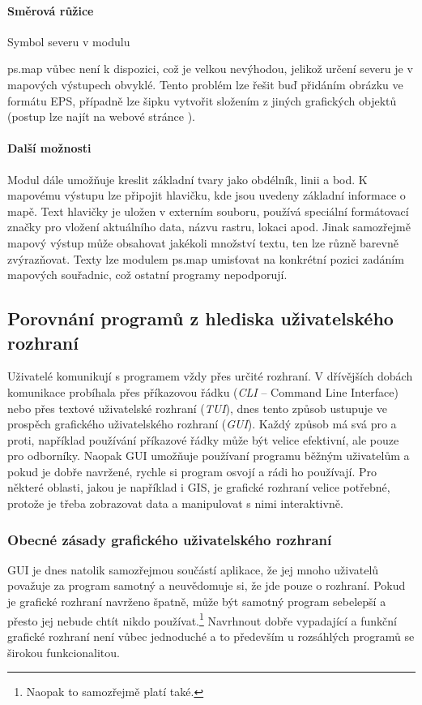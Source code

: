 \documentclass[a4paper,12pt,draft]{article}
\begin{document}
\paragraph*{Směrová růžice}
Symbol severu v modulu {ps.map vůbec není k dispozici, což je velkou
nevýhodou, jelikož určení severu je v mapových výstupech obvyklé. Tento
problém lze řešit buď přidáním obrázku ve formátu EPS, případně
lze šipku vytvořit složením z jiných grafických objektů (postup lze
najít na webové stránce \cite{wiki_psmap_north}).

\paragraph*{Další možnosti}
Modul dále umožňuje kreslit základní tvary jako obdélník, linii a
bod. K mapovému výstupu lze připojit hlavičku, kde jsou uvedeny základní
informace o mapě. Text hlavičky je uložen v externím souboru, používá
speciální formátovací značky pro vložení aktuálního data, názvu
rastru, lokaci apod. Jinak samozřejmě mapový výstup může obsahovat
jakékoli množství textu, ten lze různě barevně zvýrazňovat. Texty lze
modulem ps.map umisťovat na konkrétní pozici zadáním mapových
souřadnic, což ostatní programy nepodporují.




\subsection{Porovnání programů  z hlediska
uživatelského rozhraní}
Uživatelé komunikují s programem vždy přes určité rozhraní. V
dřívějších dobách komunikace probíhala přes příkazovou
řádku (\emph{CLI} -- Command Line Interface) nebo přes textové uživatelské
rozhraní (\emph{TUI}), dnes tento způsob ustupuje ve prospěch grafického
uživatelského
rozhraní (\emph{GUI}). Každý způsob má svá pro a proti, například
používání příkazové řádky může být velice efektivní, ale pouze
pro odborníky. Naopak GUI umožňuje používaní programu běžným
uživatelům a pokud je dobře navržené, rychle si program osvojí a
rádi ho používají. Pro některé oblasti, jakou je například i GIS,
je grafické rozhraní velice potřebné, protože je třeba zobrazovat data
a manipulovat s nimi interaktivně.

\subsubsection{Obecné zásady grafického uživatelského rozhraní}
GUI je dnes natolik samozřejmou součástí aplikace, že jej mnoho
uživatelů považuje za program samotný a neuvědomuje si, že jde
pouze o rozhraní. Pokud je grafické rozhraní navrženo špatně,
může být samotný program sebelepší a přesto jej nebude chtít nikdo
používat.\footnote{Naopak to samozřejmě platí také.} Navrhnout dobře
vypadající a funkční grafické rozhraní není vůbec jednoduché a to
především u rozsáhlých programů se širokou funkcionalitou.

}
\end{document}
